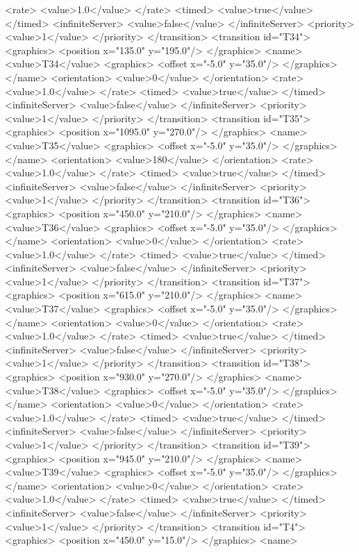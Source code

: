<rate>
<value>1.0</value>
</rate>
<timed>
<value>true</value>
</timed>
<infiniteServer>
<value>false</value>
</infiniteServer>
<priority>
<value>1</value>
</priority>
</transition>
<transition id="T34">
<graphics>
<position x="135.0" y="195.0"/>
</graphics>
<name>
<value>T34</value>
<graphics>
<offset x="-5.0" y="35.0"/>
</graphics>
</name>
<orientation>
<value>0</value>
</orientation>
<rate>
<value>1.0</value>
</rate>
<timed>
<value>true</value>
</timed>
<infiniteServer>
<value>false</value>
</infiniteServer>
<priority>
<value>1</value>
</priority>
</transition>
<transition id="T35">
<graphics>
<position x="1095.0" y="270.0"/>
</graphics>
<name>
<value>T35</value>
<graphics>
<offset x="-5.0" y="35.0"/>
</graphics>
</name>
<orientation>
<value>180</value>
</orientation>
<rate>
<value>1.0</value>
</rate>
<timed>
<value>true</value>
</timed>
<infiniteServer>
<value>false</value>
</infiniteServer>
<priority>
<value>1</value>
</priority>
</transition>
<transition id="T36">
<graphics>
<position x="450.0" y="210.0"/>
</graphics>
<name>
<value>T36</value>
<graphics>
<offset x="-5.0" y="35.0"/>
</graphics>
</name>
<orientation>
<value>0</value>
</orientation>
<rate>
<value>1.0</value>
</rate>
<timed>
<value>true</value>
</timed>
<infiniteServer>
<value>false</value>
</infiniteServer>
<priority>
<value>1</value>
</priority>
</transition>
<transition id="T37">
<graphics>
<position x="615.0" y="210.0"/>
</graphics>
<name>
<value>T37</value>
<graphics>
<offset x="-5.0" y="35.0"/>
</graphics>
</name>
<orientation>
<value>0</value>
</orientation>
<rate>
<value>1.0</value>
</rate>
<timed>
<value>true</value>
</timed>
<infiniteServer>
<value>false</value>
</infiniteServer>
<priority>
<value>1</value>
</priority>
</transition>
<transition id="T38">
<graphics>
<position x="930.0" y="270.0"/>
</graphics>
<name>
<value>T38</value>
<graphics>
<offset x="-5.0" y="35.0"/>
</graphics>
</name>
<orientation>
<value>0</value>
</orientation>
<rate>
<value>1.0</value>
</rate>
<timed>
<value>true</value>
</timed>
<infiniteServer>
<value>false</value>
</infiniteServer>
<priority>
<value>1</value>
</priority>
</transition>
<transition id="T39">
<graphics>
<position x="945.0" y="210.0"/>
</graphics>
<name>
<value>T39</value>
<graphics>
<offset x="-5.0" y="35.0"/>
</graphics>
</name>
<orientation>
<value>0</value>
</orientation>
<rate>
<value>1.0</value>
</rate>
<timed>
<value>true</value>
</timed>
<infiniteServer>
<value>false</value>
</infiniteServer>
<priority>
<value>1</value>
</priority>
</transition>
<transition id="T4">
<graphics>
<position x="450.0" y="15.0"/>
</graphics>
<name>
